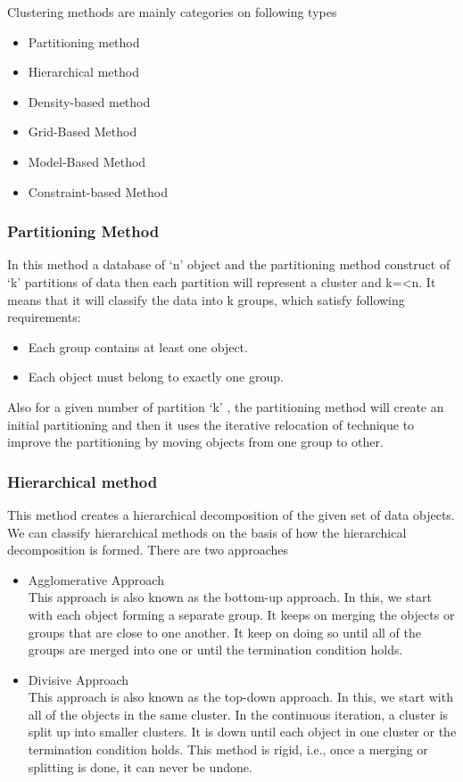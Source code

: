 \documentclass{article}
\begin{document}
Clustering methods are mainly categories on following types
\begin{itemize}
\item Partitioning method
\item Hierarchical method
\item Density-based method
\item Grid-Based Method
\item Model-Based Method
\item Constraint-based Method
\end{itemize}

\subsubsection{Partitioning Method}\label{clustering methods}
In this method a database of ‘n’ object and the partitioning method construct of ‘k’ partitions of data then each partition will represent a cluster and k=<n. It means that it will classify the data into k groups, which satisfy following requirements:
\begin{itemize}
\item Each group contains at least one object.
\item Each object must belong to exactly one group.
\end{itemize}
Also for a given number of partition ‘k’ , the partitioning method will create an initial partitioning and then it uses the iterative relocation of technique to improve the partitioning by moving objects from one group to other.

\subsubsection{Hierarchical method}\label{clustering methods}

This method creates a hierarchical decomposition of the given set of data objects. We can classify hierarchical methods on the basis of how the hierarchical decomposition is formed. There are two approaches
\begin{itemize}
\item Agglomerative Approach\\
This approach is also known as the bottom-up approach. In this, we start with each object forming a separate group. It keeps on merging the objects or groups that are close to one another. It keep on doing so until all of the groups are merged into one or until the termination condition holds.\\

\item Divisive Approach\\
This approach is also known as the top-down approach. In this, we start with all of the objects in the same cluster. In the continuous iteration, a cluster is split up into smaller clusters. It is down until each object in one cluster or the termination condition holds. This method is rigid, i.e., once a merging or splitting is done, it can never be undone.
\end{itemize}
\end{document}
